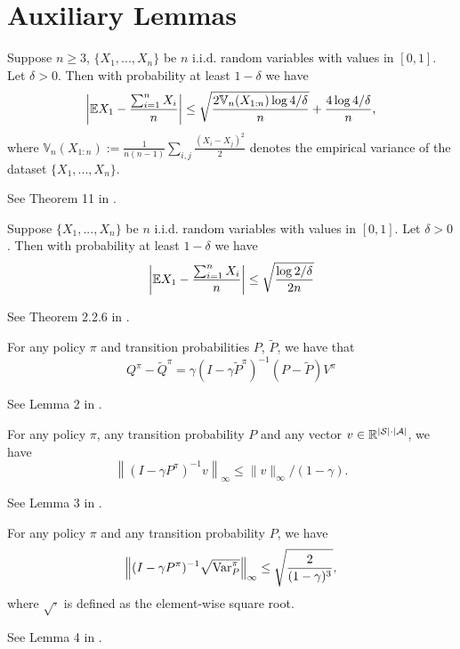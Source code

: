 \section{Auxiliary Lemmas}

\begin{lemma}
\label{Theorem_Empirical_Bernstein}
Suppose $n\geq 3$, $\{X_1,...,X_n\}$ be $n$ i.i.d. random variables with values in $[0,1]$. 
Let $\delta>0$. 
Then with probability at least $1-\delta$ we have
$$
\left|{\mathbb E} X_1-\frac{\sum_{i=1}^n X_i}{n}\right|\leq\sqrt{\frac{2\mathbb{V}_n(X_{1:n})\log4/\delta}{n}}+\frac{4\log 4/\delta}{n},
$$
where $\mathbb{V}_n(X_{1:n}):=\frac{1}{n(n-1)}\sum_{i,j}\frac{(X_i-X_j)^2}{2}$ denotes the empirical variance of the dataset $\{X_1,...,X_n\}$.
\end{lemma}
See Theorem 11 in \cite{maurer2009empirical}.
\endproof

\begin{lemma}
\label{Theorem_Hoeffding_Inequality}
Suppose $\{X_1,...,X_n\}$ be $n$ i.i.d. random variables with values in $[0,1]$.
Let $\delta>0$. 
Then with probability at least $1-\delta$ we have
$$
\left|{\mathbb E} X_1-\frac{\sum_{i=1}^n X_i}{n}\right|\leq\sqrt{\frac{\log 2/\delta}{2n}}
$$
\end{lemma}
See Theorem 2.2.6 in \cite{vershynin_2018}.
\endproof

\begin{lemma}\label{Lemma_Simulation_Lemma}
For any policy $\pi$ and transition probabilities $P$, $\widetilde{P}$, we have that
$$Q^{\pi}-\widetilde{Q}^{\pi}=\gamma\left(I-\gamma \widetilde{P}^{\pi}\right)^{-1}(P-\widetilde{P}) V^{\pi}
$$
\end{lemma}
See Lemma 2 in \cite{pmlr-v125-agarwal20b}.
\endproof

\begin{lemma}\label{Lemma_Norm_of_Inf_Horizon_Expectation}
For any policy $\pi$, any transition probability $P$ and any vector $v\in {\mathbb R}^{|{\mathcal{S}}|\cdot|{\mathcal{A}}|}$, we have 
$$\left\|\left(I-\gamma P^{\pi}\right)^{-1} v\right\|_{\infty} \leq\|v\|_{\infty} /(1-\gamma).
$$
\end{lemma}
See Lemma 3 in \cite{pmlr-v125-agarwal20b}.
\endproof

\begin{lemma}\label{Lemma_Bound_of_Weighted_Variance}
For any policy $\pi$ and any transition probability $P$, we have
$$\left\|(I-\gamma P^\pi)^{-1} \sqrt{\mathrm{Var}_P^\pi}\right\|_\infty\leq\sqrt{\frac{2}{(1-\gamma)^3}},
$$
where $\sqrt{\cdot}$ is defined as the element-wise square root.
\end{lemma}
See Lemma 4 in \cite{pmlr-v125-agarwal20b}.
\endproof

